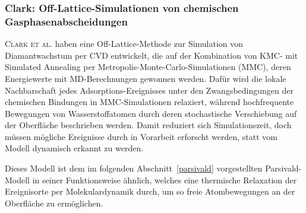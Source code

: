 \subsubsection{Clark: Off-Lattice-Simulationen von chemischen Gasphasenabscheidungen}
\textsc{Clark et al.}\cite{clark_hybrid_1996} haben eine Off-Lattice-Methode zur Simulation von Diamantwachstum per CVD entwickelt, die auf der Kombination von KMC- mit Simulated Annealing per Metropolis-Monte-Carlo-Simulationen (MMC), deren Energiewerte mit MD-Berechnungen gewonnen werden.
Dafür wird die lokale Nachbarschaft jedes Adsorptions-Ereignisses unter den Zwangsbedingungen der chemischen Bindungen in MMC-Simu\-la\-tionen relaxiert, während hochfrequente Bewegungen von Wasserstoffatomen durch deren stochastische Verschiebung auf der Oberfläche beschrieben werden.
Damit reduziert sich Simulationszeit, doch müssen mögliche Ereignisse durch in Vorarbeit erforscht werden, statt vom Modell dynamisch erkannt zu werden.


Dieses Modell ist dem im folgenden Abschnitt~\ref{parsivald} vorgestellten Parsivald-Modell in seiner Funktionsweise ähnlich, welches eine thermische Relaxation der Ereignisorte per Molekulardynamik durch, um so freie Atombewegungen an der Oberfläche zu ermöglichen.

